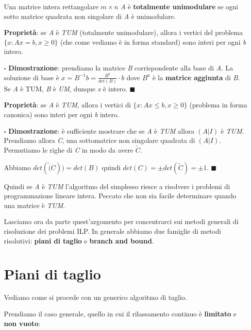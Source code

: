 \documentclass[11pt]{book}
\begin{document}
Una  matrice intera rettangolare $m \times n$ {\em A} \`e {\bf
  totalmente unimodulare} se ogni sotto matrice quadrata non singolare
di {\em A} \`e unimodulare.

{\bf Propriet\`a}: se {\em A} \`e {\em TUM} (totalmente unimodulare),
allora i vertici del problema $\{x : Ax=b, x \geq 0 \}$ (che come
vediamo \`e in forma standard) sono interi per ogni {\em b} intero.

\vspace{11pt}
$\square$ {\bf Dimostrazione}: prendiamo la matrice {\em B}
corrispondente alla base di {\em A}. La soluzione di base \`e $x =
B^{-1}b = \frac{B^a}{det(B)}\cdot b$ dove $B^a$ \`e la {\bf matrice
  aggiunta} di {\em B}. Se {\em A} \`e TUM, {\em B} \`e {\em UM},
dunque {\em x} \`e intero. $\blacksquare$
\vspace{11pt}

{\bf Propriet\`a}: se {\em A} \`e {\em TUM}, allora i vertici di $\{ x :
Ax \leq b, x \geq 0 \}$ (problema in forma canonica) sono interi per
ogni {\em b} intero.

\vspace{11pt}
$\square$ {\bf Dimostrazione}: \`e sufficiente mostrare che se {\em A}
\`e {\em TUM} allora $(A|I)$ \`e {\em TUM}. Prendiamo allora {\em C},
una sottomatrice non singolare quadrata di $(A|I)$. Permutiamo le
righe di {\em C} in modo da avere $\tilde{C}$.

Abbiamo $det(\tilde(C)) = det(B)$ quindi $det(C) = \pm det(\tilde{C})
= \pm 1$. $\blacksquare$
\vspace{11pt}

Quindi se {\em A} \`e {\em TUM} l'algoritmo del simplesso riesce a
risolvere i problemi di programmazione lineare intera. Peccato che non
sia facile determinare quando una matrice \`e {\em TUM}.

Lasciamo ora da parte quest'argomento per concentrarci sui metodi
generali di risoluzione dei problemi ILP. In generale abbiamo due
famiglie di metodi risolutivi: {\bf piani di taglio} e {\bf branch and
  bound}.

\section{Piani di taglio}

Vediamo come si procede con un generico algoritmo di taglio.

Prendiamo il caso generale, quello in cui il rilassamento continuo \`e
{\bf limitato} e {\bf non vuoto}:
\end{document}
